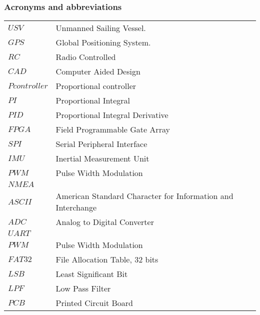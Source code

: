 \subsubsection*{Acronyms and abbreviations}

\begingroup
\renewcommand{\arraystretch}{1.2}
\begin{tabular}{@{}p{2.5cm} l}
    $USV$ & Unmanned Sailing Vessel. \\
    $GPS$ & Global Positioning System. \\
    $RC$ & Radio Controlled \\
    $CAD$ & Computer Aided Design \\
    $P controller$ & Proportional controller \\
    $PI$ & Proportional Integral \\
    $PID$ & Proportional Integral Derivative \\
    $FPGA$ & Field Programmable Gate Array \\
    $SPI$ & Serial Peripheral Interface \\
    $IMU$ & Inertial Measurement Unit \\
    $PWM$ & Pulse Width Modulation \\
    $NMEA$ & \\
    $ASCII$ & American Standard Character for Information and Interchange \\
    $ADC$ & Analog to Digital Converter \\
    $UART$ & \\
    $PWM$ & Pulse Width Modulation \\   
    $FAT32$ & File Allocation Table, 32 bits \\
    $LSB$ & Least Significant Bit \\
    $LPF$ & Low Pass Filter \\
    $PCB$ & Printed Circuit Board \\

\end{tabular}

